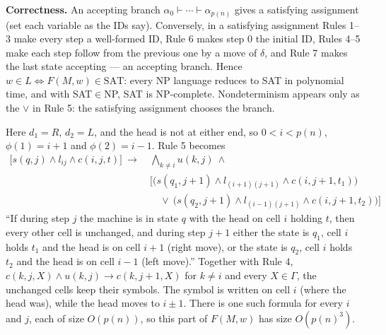 \documentclass[11pt,a4paper]{article}
\newcommand{\sub}[1]{\par\smallskip{\sffamily\bfseries\small\color{inksoft}#1}\par}
\begin{document}
\begin{solution}
\textbf{Correctness.} An accepting branch $\alpha_0\vdash\cdots\vdash\alpha_{p(n)}$ gives a satisfying assignment (set each variable as the IDs say). Conversely, in a satisfying assignment Rules 1--3 make every step a well-formed ID, Rule 6 makes step 0 the initial ID, Rules 4--5 make each step follow from the previous one by a move of $\delta$, and Rule 7 makes the last state accepting --- an accepting branch. Hence $w\in L\iff F(M,w)\in\mathrm{SAT}$: every NP language reduces to SAT in polynomial time, and with SAT$\in$NP, SAT is NP-complete. Nondeterminism appears only as the $\vee$ in Rule 5: the satisfying assignment chooses the branch.

\sub{Part 2: the rule for $\delta(q,t)=\{(q_1,t_1,R),(q_2,t_2,L)\}$}
Here $d_1=R$, $d_2=L$, and the head is not at either end, so $0<i<p(n)$, $\phi(1)=i+1$ and $\phi(2)=i-1$. Rule 5 becomes
\[\boxed{\begin{aligned}\big[s(q,j)\wedge l_{ij}\wedge c(i,j,t)\big]\ \rightarrow\ &\bigwedge_{k\neq i}u(k,j)\ \wedge\\ &\Big[\big(s(q_1,j{+}1)\wedge l_{(i+1)(j+1)}\wedge c(i,j{+}1,t_1)\big)\\ &\quad\vee\ \big(s(q_2,j{+}1)\wedge l_{(i-1)(j+1)}\wedge c(i,j{+}1,t_2)\big)\Big]\end{aligned}}\]
``If during step $j$ the machine is in state $q$ with the head on cell $i$ holding $t$, then every other cell is unchanged, and during step $j+1$ either the state is $q_1$, cell $i$ holds $t_1$ and the head is on cell $i+1$ (right move), or the state is $q_2$, cell $i$ holds $t_2$ and the head is on cell $i-1$ (left move).'' Together with Rule 4, $c(k,j,X)\wedge u(k,j)\rightarrow c(k,j+1,X)$ for $k\neq i$ and every $X\in\Gamma$, the unchanged cells keep their symbols. The symbol is written on cell $i$ (where the head was), while the head moves to $i\pm1$. There is one such formula for every $i$ and $j$, each of size $O(p(n))$, so this part of $F(M,w)$ has size $O(p(n)^3)$.
\end{solution}
\end{document}
